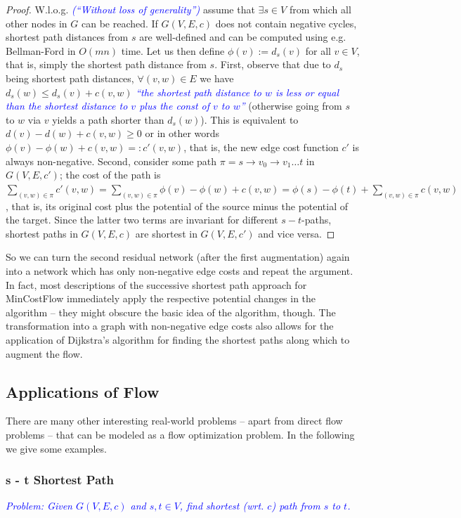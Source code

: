 \documentclass{article}
\begin{document}
\begin{proof}
W.l.o.g. \textcolor{blue}{\emph{("`Without loss of generality"')}} assume that $\exists s\in V$ from which all other nodes in $G$ can be reached. If $G(V,E,c)$ does not contain negative cycles, shortest path distances from $s$ are well-defined and can be computed using e.g. Bellman-Ford in $O(mn)$ time. Let us then define $\phi(v):=d_s(v)$ for all $v\in V$, that is, simply the shortest path distance from $s$. First, observe that due to $d_s$ being shortest path distances, $\forall (v,w)\in E$ we have $d_s(w)\leq d_s(v)+c(v,w)$ \textcolor{blue}{\emph{"`the shortest path distance to $w$ is less or equal than the shortest distance to $v$ plus the const of $v$ to $w$"'}} (otherwise going from $s$ to $w$ via $v$ yields a path shorter than $d_s(w)$). This is equivalent to $d(v)-d(w)+c(v,w)\geq 0$ or in other words $\phi(v)-\phi(w)+c(v,w)=:c'(v,w)$, that is, the new edge cost function $c'$ is always non-negative. Second, consider some path $\pi=s \rightarrow v_0 \rightarrow v_1 \dots t$ in $G(V,E,c')$; the cost of the path is $\sum_{(v,w)\in \pi} c'(v,w)=\sum_{(v,w)\in \pi} \phi(v)-\phi(w)+c(v,w)=\phi(s)-\phi(t)+\sum_{(v,w)\in\pi}c(v,w)$, that is, its original cost plus the potential of the source minus the potential of the target. Since the latter two terms are invariant for different $s-t$-paths, shortest paths in $G(V,E,c)$ are shortest in $G(V,E,c')$ and vice versa.
\end{proof}


So we can turn the second residual network (after the first augmentation) again into a network which has only non-negative edge costs and repeat the argument. In fact, most descriptions of the successive shortest path approach for MinCostFlow immediately apply the respective potential changes in the algorithm -- they might obscure the basic idea of the algorithm, though. The transformation into a graph with non-negative edge costs also allows for the application of Dijkstra's algorithm for finding the shortest paths along which to augment the flow.


\subsection{Applications of Flow}
There are many other interesting real-world problems -- apart from direct flow problems -- that can be modeled as a flow optimization problem. In the following we give some examples. 

\subsubsection{s - t Shortest Path}
\textcolor{blue}{\emph{Problem: Given $G(V,E,c)$ and $s,t \in V$, find shortest (wrt. $c$) path from $s$ to $t$.}}
\end{document}
